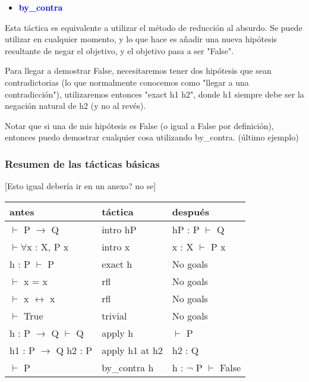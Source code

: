 \documentclass{article}
\begin{document}

\begin{itemize}
  \item \textbf{\textcolor{blue}{by\_contra}}
\end{itemize}

Esta táctica es equivalente a utilizar el método de reducción al absurdo. Se puede utilizar en cualquier momento, y lo que hace es añadir una nueva hipótesis resultante de negar el objetivo, y el objetivo pasa a ser "False".

Para llegar a demostrar False, necesitaremos tener dos hipótesis que sean contradictorias (lo que normalmente conocemos como "llegar a una contradicción"), utilizaremos entonces "exact h1 h2", donde h1 siempre debe ser la negación natural de h2 (y no al revés).


Notar que si una de mis hipótesis es False (o igual a False por definición), entonces puedo demostrar cualquier cosa utilizando by\_contra. (último ejemplo)

\subsubsection{Resumen de las tácticas básicas}


[Esto igual debería ir en un anexo? no se]

\renewcommand{\arraystretch}{2}

\begin{center}
\begin{tabular}{|  m{8em}  |m{8em} |m{8em}  |} 
  \hline
  \textbf{antes} & \textbf{táctica} & \textbf{después} \\
  \hline
  $\vdash$ P $\rightarrow$ Q & intro hP & \parbox{8em}{hP : P \\ $\vdash$ Q} \\ 
  \hline
  $\vdash \forall$x : X, P x & intro x &  \parbox{8em}{x : X \\ $\vdash$ P x} \\ 
  \hline
  \parbox{8em}{h : P \\ $\vdash$ P}& exact h & No goals\\ 
  \hline
  $\vdash$ x = x & rfl & No goals\\ 
  \hline
  $\vdash$ x $\leftrightarrow$ x & rfl & No goals\\ 
  \hline
  $\vdash$ True & trivial & No goals \\ 
  \hline
  \parbox{8em}{h : P $\rightarrow$ Q \\ $\vdash$ Q} & apply h & $\vdash$ P\\ 
  \hline
  \parbox{8em}{h1 : P $\rightarrow$ Q \\ h2 : P} & apply h1 at h2 & h2 : Q\\ 
  \hline
  $\vdash$ P & by\_contra h & \parbox{8em}{h : $\neg$ P \\ $\vdash$ False} \\\hline
\end{tabular}
\end{center}
\end{document}
